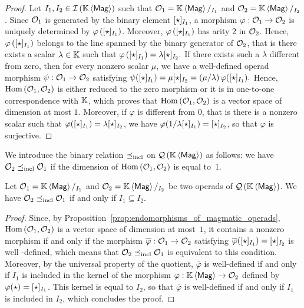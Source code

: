\begin{proof}
    Let $I_1, I_2 \in \mathcal{I}\left(\mathbb{K} \left\langle\mathsf{Mag}\right\rangle\right)$ such that $\mathcal{O}_1 = \mathbb{K} \left\langle\mathsf{Mag}\right\rangle/_{I_1}$ and
    $\mathcal{O}_2 = \mathbb{K} \left\langle\mathsf{Mag}\right\rangle/_{I_2}$. Since $\mathcal{O}_1$ is generated by the binary
    element $[\operatorname{\star}]_{I_1}$, a morphism $\varphi:\mathcal{O}_1\to\mathcal{O}_2$ is
    uniquely determined by $\varphi\left([\operatorname{\star}]_{I_1}\right)$.
    Moreover, $\varphi\left([\operatorname{\star}]_{I_1}\right)$ has arity $2$ in
    $\mathcal{O}_2$. Hence, $\varphi\left([\operatorname{\star}]_{I_1}\right)$ belongs to
    the line spanned by the binary generator of $\mathcal{O}_2$, that is there
    exists a scalar $\lambda\in\mathbb{K}$ such that
    \begin{math}
        \varphi\left([\operatorname{\star}]_{I_1}\right)
        = \lambda[\operatorname{\star}]_{I_2}.
    \end{math}
    If there exists such a $\lambda$ different from zero, then for every
    nonzero scalar $\mu$, we have a well-defined operad morphism
    $\psi:\mathcal{O}_1\to\mathcal{O}_2$ satisfying
    \begin{math}
        \psi([\operatorname{\star}]_{I_1}) =\mu[\operatorname{\star}]_{I_2}
        = \left(\mu/\lambda\right)\varphi([\operatorname{\star}]_{I_1}).
    \end{math}
    Hence, $\mathrm{Hom}\left(\mathcal{O}_1,\mathcal{O}_2\right)$ is either reduced to the
    zero morphism or it is in one-to-one correspondence with $\mathbb{K}$, which
    proves that $\mathrm{Hom}\left(\mathcal{O}_1,\mathcal{O}_2\right)$ is a vector space of
    dimension at most $1$. Moreover, if $\varphi$ is different from $0$,
    that is there is a nonzero scalar such that
    $\varphi([\operatorname{\star}]_{I_1}) =\lambda[\operatorname{\star}]_{I_2}$, we have
    $\varphi(1/\lambda[\operatorname{\star}]_{I_1}) =[\operatorname{\star}]_{I_2}$, so that
    $\varphi$ is surjective.
\end{proof}
\medbreak

We introduce the binary relation $\preceq_{\mathrm{incl}}$ on $\mathcal{Q}\left(\mathbb{K} \left\langle\mathsf{Mag}\right\rangle\right)$ as follows: we
have $\mathcal{O}_2\preceq_{\mathrm{incl}}\mathcal{O}_1$ if the dimension of
$\mathrm{Hom}\left(\mathcal{O}_1,\mathcal{O}_2\right)$ is equal to~$1$.
\medbreak

\begin{Proposition} \label{prop:order_relations_on_QMag_and_ideals}
    Let $\mathcal{O}_1=\mathbb{K} \left\langle\mathsf{Mag}\right\rangle/_{I_1}$ and $\mathcal{O}_2=\mathbb{K} \left\langle\mathsf{Mag}\right\rangle/_{I_2}$ be two operads
    of $\mathcal{Q}\left(\mathbb{K} \left\langle\mathsf{Mag}\right\rangle\right)$. We have $\mathcal{O}_2\preceq_{\mathrm{incl}}\mathcal{O}_1$ if and only if
    $I_1\subseteq I_2$.
\end{Proposition}

\begin{proof}
  Since, by Proposition~\ref{prop:endomorphisms_of_magmatic_operads},
  $\mathrm{Hom}\left(\mathcal{O}_1,\mathcal{O}_2\right)$ is a vector space of
  dimension at most~$1$, it contains a nonzero morphism if and only if
  the morphism $\overline{\varphi}:\mathcal{O}_1\to\mathcal{O}_2$ satisfying
  $\overline{\varphi}([\operatorname{\star}]_{I_1})=[\operatorname{\star}]_{I_2}$ is well
  -defined, which means that $\mathcal{O}_2\preceq_{\mathrm{incl}}\mathcal{O}_1$ is equivalent to this
  condition. Moreover, by the universal property of the quotient,
  $\overline{\varphi}$ is well-defined if and only if $I_1$ is included
  in the kernel of the morphism $\varphi:\mathbb{K} \left\langle\mathsf{Mag}\right\rangle\to\mathcal{O}_2$ defined by
  $\varphi(\operatorname{\star})=[\operatorname{\star}]_{I_1}$. This kernel is equal to
  $I_2$, so that $\overline{\varphi}$ is well-defined if and only if
  $I_1$ is included in $I_2$, which concludes the proof.
\end{proof}
\medbreak

